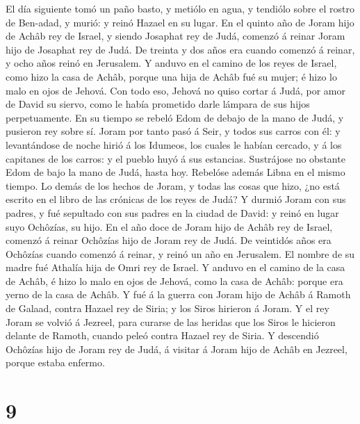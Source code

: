  El día siguiente tomó un paño basto, y metiólo en agua,
y tendiólo sobre el rostro de Ben-adad, y murió: y reinó Hazael en su
lugar.  En el quinto año de Joram hijo de Achâb rey de
Israel, y siendo Josaphat rey de Judá, comenzó á reinar Joram hijo de
Josaphat rey de Judá.  De treinta y dos años era cuando
comenzó á reinar, y ocho años reinó en Jerusalem.  Y
anduvo en el camino de los reyes de Israel, como hizo la casa de Achâb,
porque una hija de Achâb fué su mujer; é hizo lo malo en ojos de Jehová.
 Con todo eso, Jehová no quiso cortar á Judá, por amor de
David su siervo, como le había prometido darle lámpara de sus hijos
perpetuamente.  En su tiempo se rebeló Edom de debajo de
la mano de Judá, y pusieron rey sobre sí.  Joram por
tanto pasó á Seir, y todos sus carros con él: y levantándose de noche
hirió á los Idumeos, los cuales le habían cercado, y á los capitanes de
los carros: y el pueblo huyó á sus estancias.  Sustrájose
no obstante Edom de bajo la mano de Judá, hasta hoy. Rebelóse además
Libna en el mismo tiempo.  Lo demás de los hechos de
Joram, y todas las cosas que hizo, ¿no está escrito en el libro de las
crónicas de los reyes de Judá?  Y durmió Joram con sus
padres, y fué sepultado con sus padres en la ciudad de David: y reinó en
lugar suyo Ochôzías, su hijo.  En el año doce de Joram
hijo de Achâb rey de Israel, comenzó á reinar Ochôzías hijo de Joram rey
de Judá.  De veintidós años era Ochôzías cuando comenzó á
reinar, y reinó un año en Jerusalem. El nombre de su madre fué Athalía
hija de Omri rey de Israel.  Y anduvo en el camino de la
casa de Achâb, é hizo lo malo en ojos de Jehová, como la casa de Achâb:
porque era yerno de la casa de Achâb.  Y fué á la guerra
con Joram hijo de Achâb á Ramoth de Galaad, contra Hazael rey de Siria;
y los Siros hirieron á Joram.  Y el rey Joram se volvió á
Jezreel, para curarse de las heridas que los Siros le hicieron delante
de Ramoth, cuando peleó contra Hazael rey de Siria. Y descendió Ochôzías
hijo de Joram rey de Judá, á visitar á Joram hijo de Achâb en Jezreel,
porque estaba enfermo.

\hypertarget{section-8}{%
\section{9}\label{section-8}}

